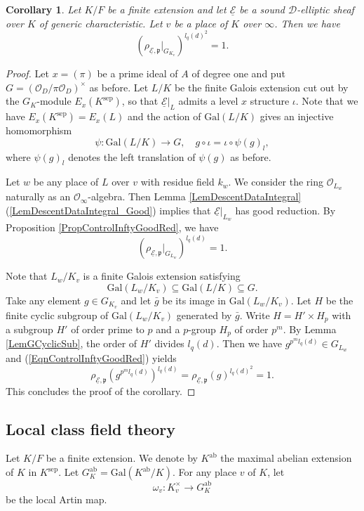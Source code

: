 \documentclass[10pt]{amsart}
\theoremstyle{plain}
\newtheorem{cor}[thm]{Corollary}
\theoremstyle{definition}
\newcommand{\ab}{\mathrm{ab}}
\newcommand{\Gal}{\mathrm{Gal}}
\newcommand{\sep}{\mathrm{sep}}
\newcommand{\cO}{\mathcal{O}}
\newcommand{\ucE}{\underline{\mathcal{E}}}
\newcommand{\sD}{\mathscr{D}}
\newcommand{\frp}{\mathfrak{p}}
\begin{document}
\begin{cor}\label{CorControlInfty}
	Let $K/F$ be a finite extension and let $\ucE$ be a sound $\sD$-elliptic sheaf over $K$ of generic characteristic.
	Let $v$ be a place of $K$ over $\infty$. 
	Then we have
	\[
	(\rho_{\ucE,\frp}|_{G_{K_v}})^{l_q(d)^2}=1.
	\]
\end{cor}
\begin{proof}
	Let $x=(\pi)$ be a prime ideal of $A$ of degree one and put $G=(\cO_D/\pi\cO_D)^\times$ as before. 
	Let $L/K$ be the finite Galois extension cut out by the $G_K$-module $E_x(K^\sep)$,
	so that $\ucE|_L$ admits a level $x$ structure $\iota$.
	Note that we have $E_x(K^\sep)=E_x(L)$ and the action of $\Gal(L/K)$ gives an injective homomorphism 
	\[
	\psi:\Gal(L/K)\to G,\quad g\circ \iota=\iota\circ \psi(g)_l,
	\]
	where $\psi(g)_l$ denotes the left translation of $\psi(g)$ as before.
	
	Let $w$ be any place of $L$ over $v$ with residue field $k_w$.
	We consider the ring $\cO_{L_w}$ naturally as an $\cO_{\infty}$-algebra.
	Then Lemma \ref{LemDescentDataIntegral} (\ref{LemDescentDataIntegral_Good}) implies that
	$\ucE|_{L_w}$ has good reduction. By Proposition \ref{PropControlInftyGoodRed}, we have
	\begin{equation}\label{EqnControlInftyGoodRed}
	(\rho_{\ucE,\frp}|_{G_{L_w}})^{l_q(d)}=1.
	\end{equation}
	
	
	
	Note that $L_w/K_v$ is a finite Galois extension satisfying
	\[
	\Gal(L_w/K_v)\subseteq \Gal(L/K)\subseteq G.
	\]
	Take any element $g\in G_{K_v}$ and let $\bar{g}$ be its image in $\Gal(L_w/K_v)$. 
	Let $H$ be the finite cyclic subgroup of $\Gal(L_w/K_v)$ generated by $\bar{g}$. Write $H=H'\times H_p$ with a subgroup $H'$ 
	of order prime to $p$ and a $p$-group $H_p$ of order $p^{m}$.
	By Lemma \ref{LemGCyclicSub}, the order of $H'$ divides $l_q(d)$.
	Then we have $g^{p^{m}l_q(d)}\in G_{L_w}$ and (\ref{EqnControlInftyGoodRed}) yields
	\[
	\rho_{\ucE,\frp}(g^{p^{m}l_q(d)})^{l_q(d)}=\rho_{\ucE,\frp}(g)^{l_q(d)^2}=1.
	\]
	This concludes the proof of the corollary.
\end{proof}

\subsection{Local class field theory}\label{SubsecLCFT}

Let $K/F$ be a finite extension. 
We denote by $K^\ab$ the maximal abelian extension of $K$ in $K^\sep$.
Let $G_K^\ab=\Gal(K^\ab/K)$. For any place $v$ of $K$, let
\[
\omega_v: K_v^\times\to G_K^\ab
\]
be the local Artin map.
\end{document}
